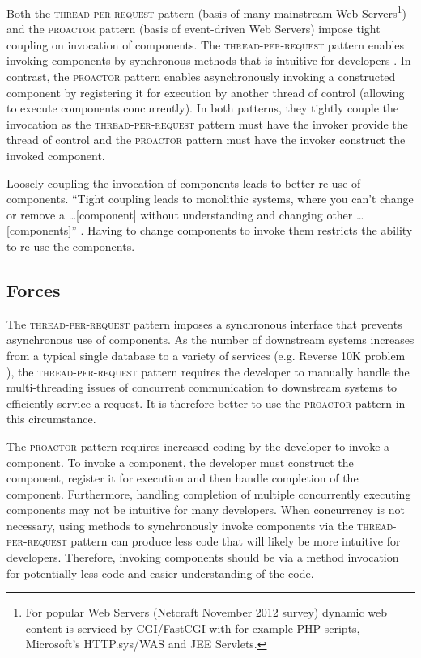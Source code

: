\documentclass[prodmode]{style/acmlarge}
\begin{document}
Both the \textsc{thread-per-request} pattern \cite{thread-per-request} (basis of
many mainstream Web Servers\footnote{For popular Web Servers (Netcraft November
2012 survey) dynamic web content is serviced by CGI/FastCGI with for example PHP
scripts, Microsoft's HTTP.sys/WAS and JEE Servlets.}) and the \textsc{proactor}
pattern \cite{proactor} (basis of event-driven Web Servers) impose tight
coupling on invocation of components.  The \textsc{thread-per-request} pattern
enables invoking components by synchronous methods that is intuitive for
developers \cite[p. 2]{proactor}.  In contrast, the \textsc{proactor} pattern
enables asynchronously invoking a constructed component by registering it for
execution by another thread of control (allowing to execute components
concurrently).  In both patterns, they tightly couple the invocation as the
\textsc{thread-per-request} pattern must have the invoker provide the thread of
control and the \textsc{proactor} pattern must have the invoker construct the
invoked component.

Loosely coupling the invocation of components leads to better re-use of
components.  ``Tight coupling leads to monolithic systems, where you can't
change or remove a \ldots [component] without understanding and changing other
\ldots [components]'' \cite[p. 24-25]{gof}.  Having to change components to
invoke them restricts the ability to re-use the components.


\subsection{Forces}

The \textsc{thread-per-request} pattern imposes a synchronous interface that
prevents asynchronous use of components.  As the number of downstream
systems increases from a typical single database to a variety of services (e.g.
Reverse 10K problem \cite{reverse-ten-k-problem}), the
\textsc{thread-per-request} pattern requires the developer to manually handle
the multi-threading issues of concurrent communication to downstream systems to
efficiently service a request.  It is therefore better to use the
\textsc{proactor} pattern in this circumstance.

The \textsc{proactor} pattern requires increased coding by the developer to
invoke a component.  To invoke a component, the developer must construct the
component, register it for execution and then handle completion of the
component.  Furthermore, handling completion of multiple concurrently executing
components may not be intuitive for many developers.  When concurrency is not
necessary, using methods to synchronously invoke components via the
\textsc{thread-per-request} pattern can produce less code that will likely be
more intuitive for developers.  Therefore, invoking components should be via a
method invocation for potentially less code and easier understanding of the
code.
\end{document}
